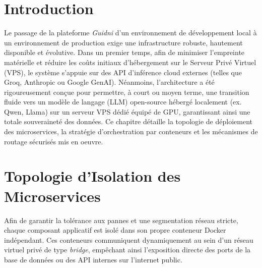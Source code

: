 \label{chp:deploiement}



\section{Introduction}
Le passage de la plateforme \textit{Guidni} d'un environnement de développement local à un environnement de production exige une infrastructure robuste, hautement disponible et évolutive. Dans un premier temps, afin de minimiser l'empreinte matérielle et réduire les coûts initiaux d'hébergement sur le Serveur Privé Virtuel (VPS), le système s'appuie sur des API d'inférence cloud externes (telles que Groq, Anthropic ou Google GenAI). Néanmoins, l'architecture a été rigoureusement conçue pour permettre, à court ou moyen terme, une transition fluide vers un modèle de langage (LLM) open-source hébergé localement (ex. Qwen, Llama) sur un serveur VPS dédié équipé de GPU, garantissant ainsi une totale souveraineté des données. Ce chapitre détaille la topologie de déploiement des microservices, la stratégie d'orchestration par conteneurs et les mécanismes de routage sécurisés mis en oeuvre.


\section{Topologie d'Isolation des Microservices}
Afin de garantir la tolérance aux pannes et une segmentation réseau stricte, chaque composant applicatif est isolé dans son propre conteneur Docker indépendant. Ces conteneurs communiquent dynamiquement au sein d'un réseau virtuel privé de type \textit{bridge}, empêchant ainsi l'exposition directe des ports de la base de données ou des API internes sur l'internet public.

